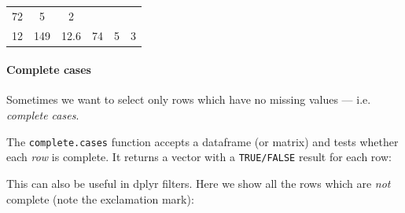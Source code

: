 \documentclass[]{article}
\newenvironment{Shaded}{\begin{snugshade}}{\end{snugshade}}
\newcommand{\KeywordTok}[1]{\textcolor[rgb]{0.13,0.29,0.53}{\textbf{#1}}}
\newcommand{\StringTok}[1]{\textcolor[rgb]{0.31,0.60,0.02}{#1}}
\newcommand{\OperatorTok}[1]{\textcolor[rgb]{0.81,0.36,0.00}{\textbf{#1}}}
\newcommand{\NormalTok}[1]{#1}
\let\oldparagraph\paragraph
\renewcommand{\paragraph}[1]{\oldparagraph{#1}\mbox{}}
\theoremstyle{definition}
\theoremstyle{definition}
\theoremstyle{definition}
\theoremstyle{remark}
\begin{document}
\begin{longtable}[]{@{}cccccc@{}}
\begin{minipage}[t]{0.08\columnwidth}
72\strut
\end{minipage} & \begin{minipage}[t]{0.09\columnwidth}\centering\strut
5\strut
\end{minipage} & \begin{minipage}[t]{0.06\columnwidth}\centering\strut
2\strut
\end{minipage}\tabularnewline
\begin{minipage}[t]{0.09\columnwidth}\centering\strut
12\strut
\end{minipage} & \begin{minipage}[t]{0.12\columnwidth}\centering\strut
149\strut
\end{minipage} & \begin{minipage}[t]{0.08\columnwidth}\centering\strut
12.6\strut
\end{minipage} & \begin{minipage}[t]{0.08\columnwidth}\centering\strut
74\strut
\end{minipage} & \begin{minipage}[t]{0.09\columnwidth}\centering\strut
5\strut
\end{minipage} & \begin{minipage}[t]{0.06\columnwidth}\centering\strut
3\strut
\end{minipage}\tabularnewline
\bottomrule
\end{longtable}

\paragraph{Complete cases}\label{complete-cases}

Sometimes we want to select only rows which have no missing values ---
i.e. \emph{complete cases}.

The \texttt{complete.cases} function accepts a dataframe (or matrix) and
tests whether each \emph{row} is complete. It returns a vector with a
\texttt{TRUE/FALSE} result for each row:

\begin{Shaded}
\end{Shaded}

This can also be useful in dplyr filters. Here we show all the rows
which are \emph{not} complete (note the exclamation mark):
\end{document}
